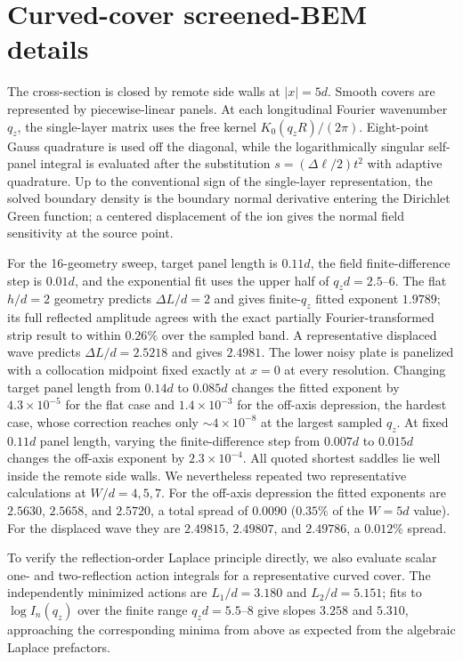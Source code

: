 \documentclass[aps,pra,twocolumn,superscriptaddress,longbibliography,nofootinbib,floatfix]{revtex4-2}
\theoremstyle{remark}
\begin{document}
\section{Curved-cover screened-BEM details}
\label{app:saddlenum}

The cross-section is closed by remote side walls at $|x|=5d$.  Smooth covers are represented by piecewise-linear panels.  At each longitudinal Fourier wavenumber $q_z$, the single-layer matrix uses the free kernel $K_0(q_zR)/(2\pi)$.  Eight-point Gauss quadrature is used off the diagonal, while the logarithmically singular self-panel integral is evaluated after the substitution $s=(\Delta\ell/2)t^2$ with adaptive quadrature.  Up to the conventional sign of the single-layer representation, the solved boundary density is the boundary normal derivative entering the Dirichlet Green function; a centered displacement of the ion gives the normal field sensitivity at the source point.

For the 16-geometry sweep, target panel length is $0.11d$, the field finite-difference step is $0.01d$, and the exponential fit uses the upper half of $q_zd=2.5$--$6$.  The flat $h/d=2$ geometry predicts $\Delta L/d=2$ and gives finite-$q_z$ fitted exponent $1.9789$; its full reflected amplitude agrees with the exact partially Fourier-transformed strip result to within $0.26\%$ over the sampled band.  A representative displaced wave predicts $\Delta L/d=2.5218$ and gives $2.4981$.  The lower noisy plate is panelized with a collocation midpoint fixed exactly at $x=0$ at every resolution.  Changing target panel length from $0.14d$ to $0.085d$ changes the fitted exponent by $4.3\times10^{-5}$ for the flat case and $1.4\times10^{-3}$ for the off-axis depression, the hardest case, whose correction reaches only $\sim4\times10^{-8}$ at the largest sampled $q_z$.  At fixed $0.11d$ panel length, varying the finite-difference step from $0.007d$ to $0.015d$ changes the off-axis exponent by $2.3\times10^{-4}$.  All quoted shortest saddles lie well inside the remote side walls.  We nevertheless repeated two representative calculations at $W/d=4,5,7$.  For the off-axis depression the fitted exponents are $2.5630$, $2.5658$, and $2.5720$, a total spread of $0.0090$ ($0.35\%$ of the $W=5d$ value).  For the displaced wave they are $2.49815$, $2.49807$, and $2.49786$, a $0.012\%$ spread.



To verify the reflection-order Laplace principle directly, we also evaluate scalar one- and two-reflection action integrals for a representative curved cover.  The independently minimized actions are $L_1/d=3.180$ and $L_2/d=5.151$; fits to $\log I_n(q_z)$ over the finite range $q_zd=5.5$--$8$ give slopes $3.258$ and $5.310$, approaching the corresponding minima from above as expected from the algebraic Laplace prefactors.
\end{document}
